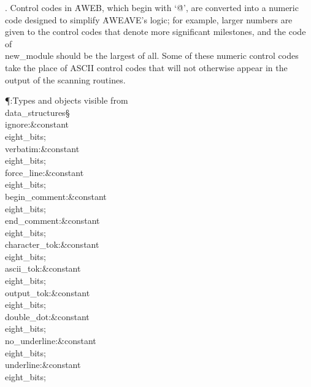 . Control codes in \.{AWEB}, which begin with `\.{@}', are converted
into a numeric code designed to simplify \.{AWEAVE}'s logic; for example,
larger numbers are given to the control codes that denote more significant
milestones, and the code of \\{new\_module} should be the largest of
all. Some of these numeric control codes take the place of ASCII
control codes that will not otherwise appear in the output of the
scanning routines.

\Y\P\?\4:Types and objects visible from \\{data\_structures}\X\mathrel{+}\S%
\?\6
\\{ignore}\?:\?\&{constant}\8\\{eight\_bits}\?\K{};\6
\\{verbatim}\?:\?\&{constant}\8\\{eight\_bits}\?\K{}\?;\6
\\{force\_line}\?:\?\&{constant}\8\\{eight\_bits}\?\K{}\?;\6
\\{begin\_comment}\?:\?\&{constant}\8\\{eight\_bits}\?\K{}\?;\6
\\{end\_comment}\?:\?\&{constant}\8\\{eight\_bits}\?\K{}\?;\6
\\{character\_tok}\?:\?\&{constant}\8\\{eight\_bits}\?\K{}\?;\6
\\{ascii\_tok}\?:\?\&{constant}\8\\{eight\_bits}\?\K{}\?;\6
\\{output\_tok}\?:\?\&{constant}\8\\{eight\_bits}\?\K{}\?;\6
\\{double\_dot}\?:\?\&{constant}\8\\{eight\_bits}\?\K{}\?;\6
\\{no\_underline}\?:\?\&{constant}\8\\{eight\_bits}\?\K{}\?;\6
\\{underline}\?:\?\&{constant}\8\\{eight\_bits}\?\K{}\?;\6
